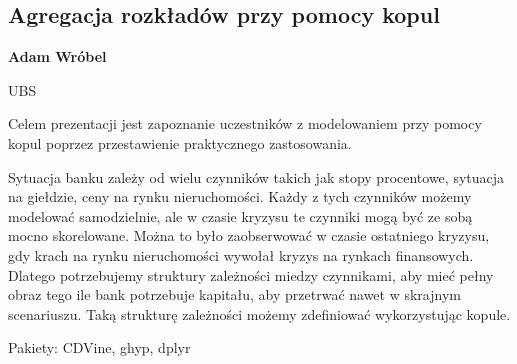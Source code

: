 \documentclass[\main/boa.tex]{subfiles}
\begin{document}
\subsection{Agregacja rozkładów przy pomocy kopul}

\begin{minipage}{0.915\textwidth}
	\centering
  {\bf {} Adam Wróbel}
\end{minipage}


\begin{affiliations}
\begin{minipage}{0.915\textwidth}
\centering
UBS \\[-2pt]
\end{minipage}
\end{affiliations}

\vskip 0.3cm
Celem prezentacji jest zapoznanie uczestników z modelowaniem przy pomocy kopul poprzez przestawienie praktycznego zastosowania.

Sytuacja banku zależy od wielu czynników takich jak stopy procentowe, sytuacja na giełdzie, ceny na rynku nieruchomości. Każdy z tych czynników możemy modelować samodzielnie, ale w czasie kryzysu te czynniki mogą być ze sobą mocno skorelowane. Można to było zaobserwować w czasie ostatniego kryzysu, gdy krach na rynku nieruchomości wywołał kryzys na rynkach finansowych. Dlatego potrzebujemy struktury zależności miedzy czynnikami, aby mieć pełny obraz tego ile bank potrzebuje kapitału, aby przetrwać nawet w skrajnym scenariuszu. Taką strukturę zależności możemy zdefiniować wykorzystując kopule.

Pakiety: CDVine, ghyp, dplyr
\end{document}
